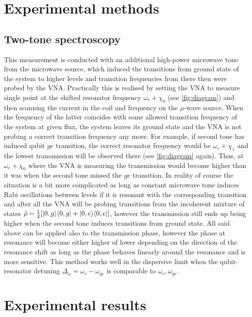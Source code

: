 \documentclass[12pt, twoside]{report}
\DeclarePairedDelimiter\bra{\langle}{\rvert}
\DeclarePairedDelimiter\ket{\lvert}{\rangle}
\numberwithin{equation}{section}
\begin{document}
\chapter{Experimental methods}

\section{Two-tone spectroscopy}
This measurement is conducted with an additional high-power microwave tone from the microwave source, which induced the transitions from ground state of the system to higher levels and transition frequencies from there then were probed by the VNA. Practically this is realised by setting the VNA to measure single point at the shifted resonator  frequency $\omega_r + \chi_0$ (see \autoref{fig:diagram}) and then scanning the current in the coil and frequency on the $\mu$-wave source. When the frequency of the latter coincides with some allowed transition frequency of the system at given flux, the system leaves its ground state and the VNA is not probing a correct transition frequency any more. For example, if second tone has induced qubit $ge$ transition, the correct resonator frequency would be $\omega_r + \chi_1$ and the lowest transmission will be observed there (see \autoref{fig:diagram} again). Thus, at $\omega_r + \chi_0$ where the VNA is measuring the transmission would become higher than it was when the second tone missed the $ge$ transition. In reality of course the situation is a bit more complicated as long as constant microwave tone induces Rabi oscillations between levels if it is resonant with the corresponding transition and after all the VNA will be probing transitions from the incoherent mixture of states $\hat \rho = \frac{1}{2} [\ket{0, g}\bra{0,g} + \ket{0, e}\bra{0,e}]$, however the transmission still ends up being higher when the second tone induces transitions from ground state. All said above can be applied also to the transmission phase, however the phase at resonance will become either higher of lower depending on the direction of the resonance shift as long as the phase behaves linearly around the resonance and is more sensitive. This method works well in the dispersive limit when the qubit-resonator detuning $\Delta_\omega = \omega_r - \omega_{ge}$ is comparable to $\omega_r, \omega_{ge}$.

\chapter{Experimental results}
\end{document}
